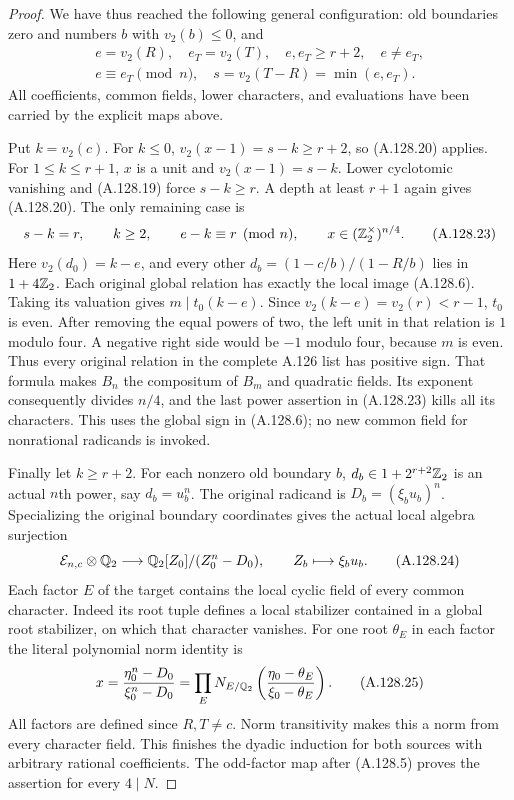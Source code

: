 \begin{proof}
We have thus reached the following general configuration:
old boundaries zero and numbers $b$ with $v_2(b)\le0$,
and
\[
 \begin{gathered}
 e=v_2(R),\quad e_T=v_2(T),\quad
 e,e_T\ge r+2,\quad e\ne e_T,\\
 e\equiv e_T\pmod n,\quad s=v_2(T-R)=\min(e,e_T).
 \end{gathered}
\tag{A.128.22}
\]
All coefficients, common fields, lower characters, and
evaluations have been carried by the explicit maps above.

Put $k=v_2(c)$.
For $k\le0$, $v_2(x-1)=s-k\ge r+2$, so (A.128.20)
applies.
For $1\le k\le r+1$, $x$ is a unit and
$v_2(x-1)=s-k$.
Lower cyclotomic vanishing and (A.128.19) force
$s-k\ge r$.
A depth at least $r+1$ again gives (A.128.20).
The only remaining case is
\[
          s-k=r,\qquad k\ge2,\qquad
          e-k\equiv r\pmod n,\qquad
          x\in(\mathbb Z_2^\times)^{n/4}.
\tag{A.128.23}
\]
Here $v_2(d_0)=k-e$, and every other
$d_b=(1-c/b)/(1-R/b)$ lies in $1+4\mathbb Z_2$.
Each original global relation has exactly the local
image (A.128.6).
Taking its valuation gives $m\mid t_0(k-e)$.
Since $v_2(k-e)=v_2(r)<r-1$, $t_0$ is even.
After removing the equal powers of two, the left
unit in that relation is $1$ modulo four.
A negative right side would be $-1$ modulo four,
because $m$ is even.
Thus every original relation in the complete A.126
list has positive sign.
That formula makes $B_n$ the compositum of $B_m$
and quadratic fields.
Its exponent consequently divides $n/4$, and the
last power assertion in (A.128.23) kills all its
characters.  This uses the global sign in (A.128.6);
no new common field for nonrational radicands is invoked.

Finally let $k\ge r+2$.
For each nonzero old boundary $b$,
$d_b\in1+2^{r+2}\mathbb Z_2$ is an actual $n$th power,
say $d_b=u_b^n$.
The original radicand is
$D_b=(\xi_bu_b)^n$.
Specializing the original boundary coordinates gives
the actual local algebra surjection
\[
 \mathcal E_{n,c}\otimes\mathbb Q_2
       \longrightarrow \mathbb Q_2[Z_0]/(Z_0^n-D_0),
                          \qquad Z_b\longmapsto\xi_bu_b.
\tag{A.128.24}
\]
Each factor $E$ of the target contains the local cyclic
field of every common character.
Indeed its root tuple defines a local stabilizer contained
in a global root stabilizer, on which that character
vanishes.
For one root $\theta_E$ in each factor the literal
polynomial norm identity is
\[
 x=\frac{\eta_0^n-D_0}{\xi_0^n-D_0}
      =\prod_E N_{E/\mathbb Q_2}
              \left(\frac{\eta_0-\theta_E}{\xi_0-\theta_E}\right).
\tag{A.128.25}
\]
All factors are defined since $R,T\ne c$.
Norm transitivity makes this a norm from every character
field.  This finishes the dyadic induction for both
sources with arbitrary rational coefficients.
The odd-factor map after (A.128.5) proves the assertion
for every $4\mid N$.


\end{proof}
